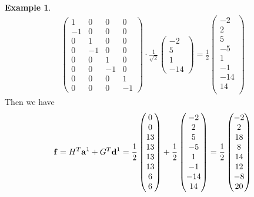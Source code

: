 \documentclass[12pt]{article}
\theoremstyle{definition}
\newtheorem{example}[definition]{Example}
\begin{document}
\begin{example}
\begin{align*}
\begin{pmatrix}
        1 & 0 & 0 & 0\\
        -1 & 0 & 0 & 0\\
        0 & 1 & 0 & 0\\
        0 & -1 & 0 & 0\\
        0 & 0 & 1 & 0\\
        0 & 0 & -1 & 0\\
        0 & 0 & 0 & 1\\
        0 & 0 & 0 & -1
      \end{pmatrix} \cdot \frac{1}{\sqrt{2}}
      \begin{pmatrix}
        -2 \\
        5 \\
        1 \\
        -14
      \end{pmatrix} = \frac{1}{2}
      \begin{pmatrix}
        -2 \\
        2 \\
        5 \\
        -5 \\
        1 \\
        -1 \\
        -14 \\
        14 \\
      \end{pmatrix}
    \end{align*}
    Then we have
    \[\vb{f} = H^T \vb{a}^1 + G^T \vb{d}^1 = \frac{1}{2}
    \begin{pmatrix}
      0 \\ 0 \\ 13 \\ 13 \\ 13 \\ 13 \\ 6 \\ 6
    \end{pmatrix} + \frac{1}{2}
    \begin{pmatrix}
      -2 \\ 2 \\ 5 \\ -5 \\ 1 \\ -1 \\ -14 \\ 14
    \end{pmatrix} = \frac{1}{2}
    \begin{pmatrix}
      -2 \\ 2 \\ 18 \\ 8 \\ 14 \\ 12 \\ -8 \\ 20

\end{pmatrix}\]
\end{example}
\end{document}

